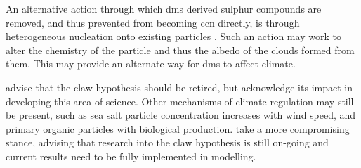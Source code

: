 		An alternative action through which \gls{dms} derived sulphur compounds are removed, and thus prevented from becoming \gls{ccn} directly, is through heterogeneous nucleation onto existing particles \citep{cainey:2007jj}. Such an action may work to alter the chemistry of the particle and thus the albedo of the clouds formed from them. This may provide an alternate way for \gls{dms} to affect climate. 

		\citet{quinn:2011iv} advise that the \gls{claw} hypothesis should be retired, but acknowledge its impact in developing this area of science. Other mechanisms of climate regulation may still be present, such as sea salt particle concentration increases with wind speed, and primary organic particles with biological production. \citet{cainey:2007jj} take a more compromising stance, advising that research into the \gls{claw} hypothesis is still on-going and current results need to be fully implemented in modelling.









